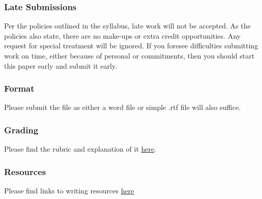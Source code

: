 \documentclass[]{article}
\begin{document}
\subsubsection{Late Submissions}\label{late-submissions}

Per the policies outlined in the syllabus, late work will not be
accepted. As the policies also state, there are no make-ups or extra
credit opportunities. Any request for special treatment will be ignored.
If you foresee difficulties submitting work on time, either because of
personal or commitments, then you should start this paper early and
submit it early.

\subsubsection{Format}\label{format}

Please submit the file as either a word file or simple .rtf file will
also suffice.

\subsubsection{Grading}\label{grading}

Please find the rubric and explanation of it
\href{/Teaching/Grading/}{here}.

\subsubsection{Resources}\label{resources}

Please find links to writing resources \href{/Teaching/Resources/}{here}
\end{document}
